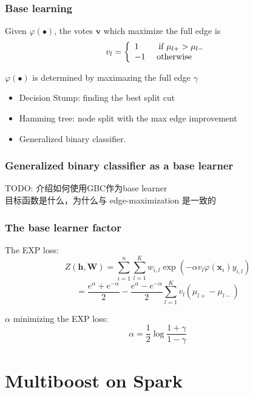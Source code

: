 \documentclass{beamer}
\begin{document}
\begin{frame}
\frametitle{Base learning}
\begin{block}{Given $\varphi(\bullet)$, the votes $\mathbf{v}$}
which maximize the full edge is
\[v_l = \left\{
  \begin{array}{l l}
  1 \quad \quad \text{   if } \mu_{l+} > \mu_{l-} \\
  -1 \quad \text{ otherwise }
  \end{array} \right. \]
\end{block}
\begin{block}{$\varphi(\bullet)$ is determined by maximazing the full edge $\gamma$}
\begin{itemize}
\item Decision Stump: finding the best split cut
\item Hamming tree: node split with the max edge improvement
\item Generalized binary classifier.
\end{itemize}
\end{block}
\end{frame}

\begin{frame}
\frametitle{Generalized binary classifier as a base learner}
TODO: 介绍如何使用GBC作为base learner \\
目标函数是什么，为什么与 edge-maximization 是一致的
\end{frame}

\begin{frame}
\frametitle{The base learner factor}
\begin{block}{The EXP loss:}
$$Z(\mathbf{h}, \mathbf{W}) = \sum_{i=1}^{n} \sum_{l=1}^{K} w_{i,l} \exp(-\alpha v_l \varphi(\mathbf{x}_i) y_{i,l}) $$
$$= \frac{e^\alpha + e^{-\alpha}}{2} - \frac{e^\alpha - e^{-\alpha}}{2} \sum_{l=1}^{K} v_l(\mu_{l+} - \mu_{l-})$$
\end{block}
\begin{block}{$\alpha$ minimizing the EXP loss:}
$$\alpha = \frac{1}{2} \log \frac{1+\gamma}{1-\gamma}$$
\end{block}
\end{frame}


\section{Multiboost on Spark}
\end{document}
